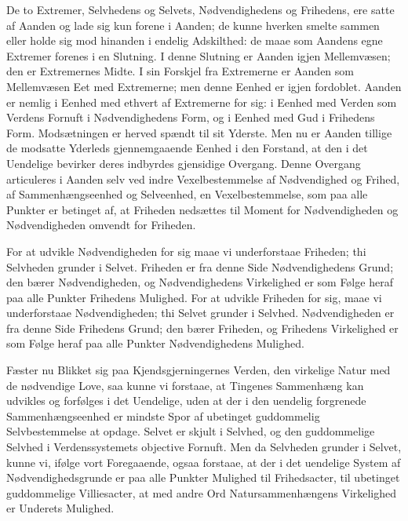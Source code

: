 \documentclass[12pt]{book}
\begin{document}
De to Extremer, Selvhedens og Selvets, Nødvendighedens og Frihedens,
ere satte af Aanden og lade sig kun forene i Aanden; de kunne
hverken smelte sammen eller holde sig mod hinanden i endelig
Adskilthed: de maae som Aandens egne Extremer forenes i en Slutning.
I denne Slutning er Aanden igjen Mellemvæsen; den er Extremernes
Midte. I sin Forskjel fra Extremerne er Aanden som Mellemvæsen Eet
med Extremerne; men denne Eenhed er igjen fordoblet. Aanden er
nemlig i Eenhed med ethvert af Extremerne for sig: i Eenhed med
Verden som Verdens Fornuft i Nødvendighedens Form, og i Eenhed med
Gud i Frihedens Form. Modsætningen er herved spændt til sit Yderste.
Men nu er Aanden tillige de modsatte Yderleds gjennemgaaende Eenhed
i den Forstand, at den i det Uendelige bevirker deres indbyrdes
gjensidige Overgang. Denne Overgang articuleres i Aanden selv ved
indre Vexelbestemmelse af Nødvendighed og Frihed, af
Sammenhængseenhed og Selveenhed, en Vexelbestemmelse, som paa alle
Punkter er betinget af, at Friheden nedsættes til Moment for
Nødvendigheden og Nødvendigheden omvendt for Friheden.

For at udvikle Nødvendigheden for sig maae vi underforstaae
Friheden; thi Selvheden grunder i Selvet. Friheden er fra denne Side
Nødvendighedens Grund; den bærer Nødvendigheden, og Nødvendighedens
Virkelighed er som Følge heraf paa alle Punkter Frihedens Mulighed.
For at udvikle Friheden for sig, maae vi underforstaae
Nødvendigheden; thi Selvet grunder i Selvhed. Nødvendigheden er fra
denne Side Frihedens Grund; den bærer Friheden, og Frihedens
Virkelighed er som Følge heraf paa alle Punkter Nødvendighedens
Mulighed.

Fæster nu Blikket sig paa Kjendsgjerningernes Verden, den virkelige
Natur med de nødvendige Love, saa kunne vi forstaae, at Tingenes
Sammenhæng kan udvikles og forfølges i det Uendelige, uden at der i
den uendelig forgrenede Sammenhængseenhed er mindste Spor af
ubetinget guddommelig Selvbestemmelse at opdage. Selvet er skjult i
Selvhed, og den guddommelige Selvhed i Verdenssystemets objective
Fornuft. Men da Selvheden grunder i Selvet, kunne vi, ifølge vort
Foregaaende, ogsaa forstaae, at der i det uendelige System af
Nødvendighedsgrunde er paa alle Punkter Mulighed til Frihedsacter,
til ubetinget guddommelige Villiesacter, at med andre Ord
Natursammenhængens Virkelighed er Underets Mulighed.
\end{document}
